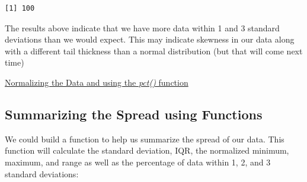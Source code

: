 \documentclass[
  letterpaper,
  DIV=11,
  numbers=noendperiod]{scrreprt}
\newenvironment{Shaded}{\begin{snugshade}}{\end{snugshade}}
\newcommand{\CommentTok}[1]{\textcolor[rgb]{0.37,0.37,0.37}{#1}}
\newcommand{\DecValTok}[1]{\textcolor[rgb]{0.68,0.00,0.00}{#1}}
\newcommand{\FunctionTok}[1]{\textcolor[rgb]{0.28,0.35,0.67}{#1}}
\newcommand{\NormalTok}[1]{\textcolor[rgb]{0.00,0.23,0.31}{#1}}
\newcommand{\SpecialCharTok}[1]{\textcolor[rgb]{0.37,0.37,0.37}{#1}}
\begin{document}
\begin{Shaded}
\end{Shaded}

\begin{verbatim}
[1] 100
\end{verbatim}

The results above indicate that we have more data within 1 and 3
standard deviations than we would expect. This may indicate skewness in
our data along with a different tail thickness than a normal
distribution (but that will come next time)

\begin{watch}{}{}
    \href{https://youtu.be/9ckiM6PbICI}{Normalizing the Data and using the \textit{pct()} function}
\end{watch}

\subsection{Summarizing the Spread using
Functions}\label{summarizing-the-spread-using-functions}

We could build a function to help us summarize the spread of our data.
This function will calculate the standard deviation, IQR, the normalized
minimum, maximum, and range as well as the percentage of data within 1,
2, and 3 standard deviations:
\end{document}
